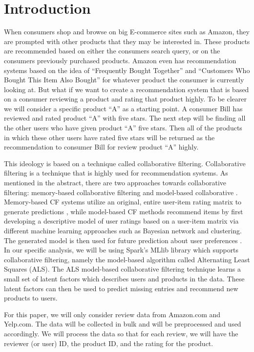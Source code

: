 \documentclass[conference]{IEEEtran}
\begin{document}
\section{Introduction}

When consumers shop and browse on big E-commerce sites such as Amazon, they are prompted with other products that they may be interested in.  These products are recommended based on either the consumers search query, or on the consumers previously purchased products.  Amazon even has recommendation systems based on the idea of “Frequently Bought Together” and “Customers Who Bought This Item Also Bought” for whatever product the consumer is currently looking at.  
But what if we want to create a recommendation system that is based on a consumer reviewing a product and rating that product highly.  To be clearer we will consider a specific product “A” as a starting point.  A consumer Bill has reviewed and rated product “A” with five stars.  The next step will be finding all the other users who have given product “A” five stars.  Then all of the products in which these other users have rated five stars will be returned as the recommendation to consumer Bill for review product “A” highly.

This ideology is based on a technique called collaborative filtering.  Collaborative filtering is a technique that is highly used for recommendation systems.  As mentioned in the abstract, there are two approaches towards collaborative filtering: memory-based collaborative filtering and model-based collaborative \cite{Breese}.  Memory-based CF systems utilize an original, entire user-item rating matrix to generate predictions \cite{Resnick}, while model-based CF methods recommend items by first developing a descriptive model of user ratings based on a user-item matrix via different machine learning approaches such as Bayesian network and clustering. The generated model is then used for future prediction about user preferences \cite{Breese}.  In our specific analysis, we will be using Spark's MLlib library which supports collaborative filtering, namely the model-based algorithm called Alternating Least Squares (ALS).  The ALS model-based collaborative filtering technique learns a small set of latent factors which describes users and products in the data.  These latent factors can then be used to predict missing entries and recommend new products to users.

For this paper, we will only consider review data from Amazon.com and Yelp.com.  The data will be collected in bulk and will be preprocessed and used accordingly.  We will process the data so that for each review, we will have the reviewer (or user) ID, the product ID, and the rating for the product.
\end{document}
